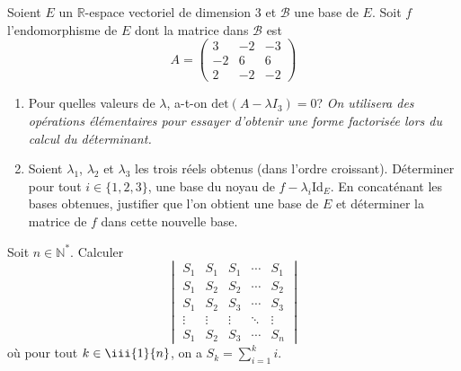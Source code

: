 \documentclass[a4paper,twoside,french,11pt]{VcCours}
\begin{document}
\begin{Exercice}{}
  Soient $E$ un $\mathbb{R}$-espace vectoriel de dimension 3 et $\mathcal{B}$ une base de $E$. Soit $f$ l'endomorphisme de $E$ dont la matrice dans $\mathcal{B}$ est
  \[
    A=\begin{pmatrix}
      3 & -2 & -3 \\
      -2 & 6 & 6 \\
      2 & -2 & -2
    \end{pmatrix}
  \]
  \begin{enumerate}
    \item Pour quelles valeurs de $\lambda$, a-t-on $\textrm{det} ( A - \lambda I_{3} ) = 0$? \textit{On utilisera des opérations élémentaires pour essayer d'obtenir une forme factorisée lors du calcul du déterminant.}
    \item Soient $\lambda_1$, $\lambda_2$ et $\lambda_3$ les trois réels obtenus (dans l'ordre croissant). Déterminer pour tout $i \in \lbrace 1,2,3 \rbrace$, une base du noyau de $f -\lambda_i \textrm{Id}_E$. En concaténant les bases obtenues, justifier que l'on obtient une base de $E$ et déterminer la matrice de $f$ dans cette nouvelle base.
  \end{enumerate}
\end{Exercice} 
    
\begin{Exercice}{}
  Soit $n \in \mathbb{N}^{*}$. Calculer
  \[
    \begin{vmatrix}
      S_{1} & S_{1} & S_{1} & \cdots & S_{1} \\
      S_{1} & S_{2} & S_{2} & \cdots & S_{2} \\
      S_{1} & S_{2} & S_{3} & \cdots & S_{3} \\
      \vdots & \vdots & \vdots & \ddots & \vdots \\
      S_{1} & S_{2} & S_{3} & \cdots & S_{n}
    \end{vmatrix}
  \]
  où pour tout $ k \in \iii{1}{n}$, on a $ S_{k} = \sum_{i = 1}^{k} i $.
\end{Exercice} 
    
\end{document}
